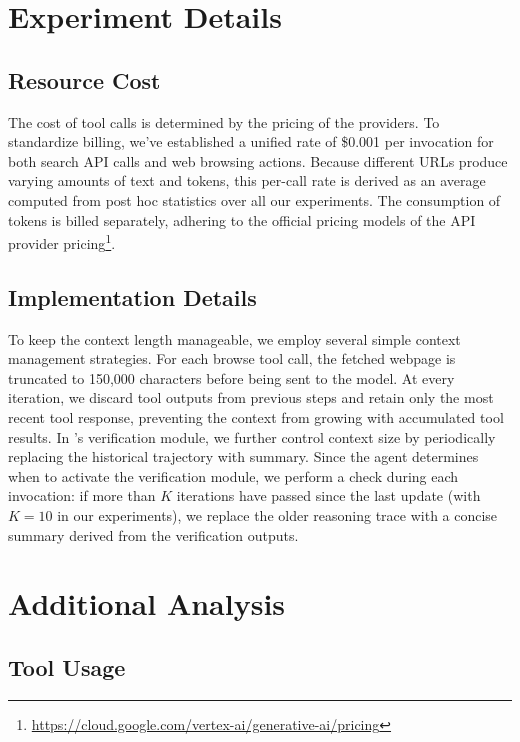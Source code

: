 \appendix
\section{Experiment Details}

\subsection{Resource Cost}
The cost of tool calls is determined by the pricing of the providers. 
To standardize billing, we've established a unified rate of \$0.001 per invocation for both search API calls and web browsing actions. 
Because different URLs produce varying amounts of text and tokens, this per-call rate is derived as an average computed from post hoc statistics over all our experiments.
The consumption of tokens is billed separately, adhering to the official pricing models of the API provider pricing\footnote{\url{https://cloud.google.com/vertex-ai/generative-ai/pricing}}.




\subsection{Implementation Details}
To keep the context length manageable, we employ several simple context management strategies. For each browse tool call, the fetched webpage is truncated to 150,000 characters before being sent to the model. At every iteration, we discard tool outputs from previous steps and retain only the most recent tool response, preventing the context from growing with accumulated tool results. 
In \method's verification module, we further control context size by periodically replacing the historical trajectory with summary. Since the agent determines when to activate the verification module, we perform a check during each invocation: if more than $K$ iterations have passed since the last update (with $K=10$ in our experiments), we replace the older reasoning trace with a concise summary derived from the verification outputs.







\section{Additional Analysis}

\subsection{Tool Usage}\label{app:usage_breakdown}

